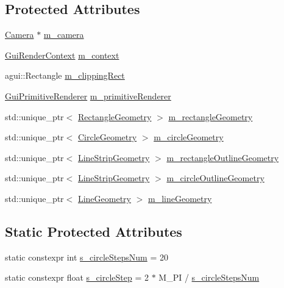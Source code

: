 \subsection*{Protected Attributes}
\begin{DoxyCompactItemize}
\item 
\mbox{\hyperlink{classec_1_1_camera}{Camera}} $\ast$ \mbox{\hyperlink{classec_1_1_open_g_l_graphics_a4d3a8b4a13012197802957a5465c6561}{m\+\_\+camera}}
\item 
\mbox{\hyperlink{structec_1_1_gui_render_context}{Gui\+Render\+Context}} \mbox{\hyperlink{classec_1_1_open_g_l_graphics_ab76d6c71e727a8a5127fae1071afe989}{m\+\_\+context}}
\item 
agui\+::\+Rectangle \mbox{\hyperlink{classec_1_1_open_g_l_graphics_aa45cbffad59139ce5f85404b755cc35f}{m\+\_\+clipping\+Rect}}
\item 
\mbox{\hyperlink{classec_1_1_gui_primitive_renderer}{Gui\+Primitive\+Renderer}} \mbox{\hyperlink{classec_1_1_open_g_l_graphics_af9728fbde00a35a87752c23e009e3864}{m\+\_\+primitive\+Renderer}}
\item 
std\+::unique\+\_\+ptr$<$ \mbox{\hyperlink{classec_1_1_rectangle_geometry}{Rectangle\+Geometry}} $>$ \mbox{\hyperlink{classec_1_1_open_g_l_graphics_a456769068c3eeca19ea08838c25d62a2}{m\+\_\+rectangle\+Geometry}}
\item 
std\+::unique\+\_\+ptr$<$ \mbox{\hyperlink{classec_1_1_circle_geometry}{Circle\+Geometry}} $>$ \mbox{\hyperlink{classec_1_1_open_g_l_graphics_af6668c5422dd67c532ac9719d8ec406c}{m\+\_\+circle\+Geometry}}
\item 
std\+::unique\+\_\+ptr$<$ \mbox{\hyperlink{classec_1_1_line_strip_geometry}{Line\+Strip\+Geometry}} $>$ \mbox{\hyperlink{classec_1_1_open_g_l_graphics_aa2d2bc4a2c3bab81188ffe5f0ec14445}{m\+\_\+rectangle\+Outline\+Geometry}}
\item 
std\+::unique\+\_\+ptr$<$ \mbox{\hyperlink{classec_1_1_line_strip_geometry}{Line\+Strip\+Geometry}} $>$ \mbox{\hyperlink{classec_1_1_open_g_l_graphics_a06d2fbaca4a675a52610462edf2afe1d}{m\+\_\+circle\+Outline\+Geometry}}
\item 
std\+::unique\+\_\+ptr$<$ \mbox{\hyperlink{classec_1_1_line_geometry}{Line\+Geometry}} $>$ \mbox{\hyperlink{classec_1_1_open_g_l_graphics_afa9f3e8e06db6aa7c2eaaead3234b40f}{m\+\_\+line\+Geometry}}
\end{DoxyCompactItemize}
\subsection*{Static Protected Attributes}
\begin{DoxyCompactItemize}
\item 
static constexpr int \mbox{\hyperlink{classec_1_1_open_g_l_graphics_a311d856061bbc1ee99d1b2e2c1c524a4}{s\+\_\+circle\+Steps\+Num}} = 20
\item 
static constexpr float \mbox{\hyperlink{classec_1_1_open_g_l_graphics_adba38a812344c43364c208caa70985e0}{s\+\_\+circle\+Step}} = 2 $\ast$ M\+\_\+\+PI / \mbox{\hyperlink{classec_1_1_open_g_l_graphics_a311d856061bbc1ee99d1b2e2c1c524a4}{s\+\_\+circle\+Steps\+Num}}
\end{DoxyCompactItemize}


